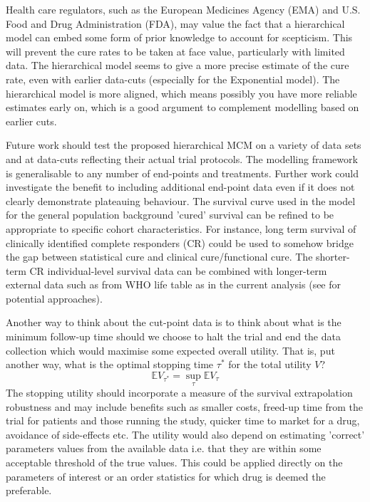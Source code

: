 \documentclass[AMA,STIX1COL]{WileyNJD-v2}
\begin{document}
Health care regulators, such as the European Medicines Agency (EMA) and U.S. Food and Drug Administration (FDA), may value the fact that a hierarchical model can embed some form of prior knowledge to account for scepticism.
This will prevent the cure rates to be taken at face value, particularly with limited data.
The hierarchical model seems to give a more precise estimate of the cure rate, even with earlier data-cuts (especially for the Exponential model).
The hierarchical model is more aligned, which means possibly you have more reliable estimates early on, which is a good argument to complement modelling based on earlier cuts.

Future work should test the proposed hierarchical MCM on a variety of data sets and at data-cuts reflecting their actual trial protocols.
The modelling framework is generalisable to any number of end-points and treatments. Further work could investigate the benefit to including additional end-point data even if it does not clearly demonstrate plateauing behaviour.
The survival curve used in the model for the general population background 'cured' survival can be refined to be appropriate to specific cohort characteristics. For instance, long term survival of clinically identified complete responders (CR) could be used to somehow bridge the gap between statistical cure and clinical cure/functional cure. The shorter-term CR individual-level survival data can be combined with longer-term external data such as from WHO life table as in the current analysis (see \citep{Jackson2017} for potential approaches).

Another way to think about the cut-point data is to think about what is the minimum follow-up time should we choose to halt the trial and end the data collection which would maximise some expected overall utility.
That is, put another way, what is the optimal stopping time $\tau^*$ for the total utility $V$?
$$
\mathbb{E} V_{\tau^*} = \sup_{\tau} \mathbb{E} V_{\tau}
$$
The stopping utility should incorporate a measure of the survival extrapolation robustness and may include benefits such as smaller costs, freed-up time from the trial for patients and those running the study, quicker time to market for a drug, avoidance of side-effects etc.
The utility would also depend on estimating 'correct' parameters values from the available data i.e. that they are within some acceptable threshold of the true values.
This could be applied directly on the parameters of interest or an order statistics for which drug is deemed the preferable.
\end{document}

